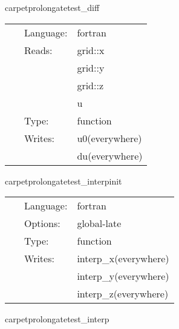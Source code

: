 \hspace{5mm} carpetprolongatetest\_diff 

\hspace{5mm}{\it test data } 


\hspace{5mm}

 \begin{tabular*}{160mm}{cll} 
~ & Language:  & fortran \\ 
~ & Reads:  & grid::x \\ 
~& ~ &grid::y\\ 
~& ~ &grid::z\\ 
~& ~ &u\\ 
~ & Type:  & function \\ 
~ & Writes:  & u0(everywhere) \\ 
~& ~ &du(everywhere)\\ 
\end{tabular*} 


\vspace{5mm}


\hspace{5mm} carpetprolongatetest\_interpinit 

\hspace{5mm}{\it set up interpolation } 


\hspace{5mm}

 \begin{tabular*}{160mm}{cll} 
~ & Language:  & fortran \\ 
~ & Options:  & global-late \\ 
~ & Type:  & function \\ 
~ & Writes:  & interp\_x(everywhere) \\ 
~& ~ &interp\_y(everywhere)\\ 
~& ~ &interp\_z(everywhere)\\ 
\end{tabular*} 


\vspace{5mm}


\hspace{5mm} carpetprolongatetest\_interp 

\hspace{5mm}{\it interpolate } 


\hspace{5mm}

